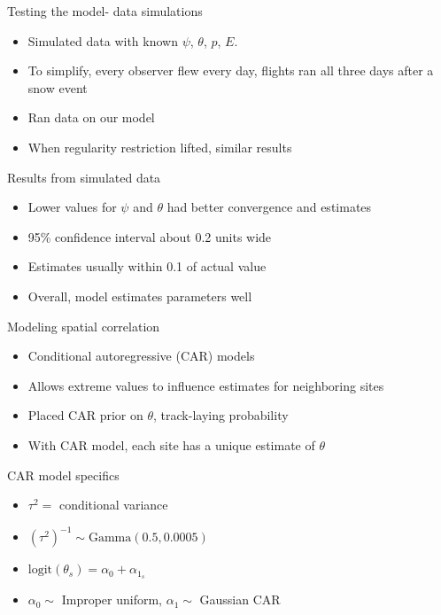 \documentclass{beamer}
\begin{document}
\begin{frame}{Testing the model- data simulations}
	\begin{itemize}
		\item Simulated data with known $\psi$, $\theta$, $p$, $E$.
		\item To simplify, every observer flew every day, flights ran all 
		three days after a snow event
		\item Ran data on our model
		\item When regularity restriction lifted, similar results
	\end{itemize}
\end{frame}

\begin{frame}{Results from simulated data}
	\begin{itemize}
		\item Lower values for $\psi$ and $\theta$ had better convergence and 
		estimates
		\item 95\% confidence interval about 0.2 units wide
		\item Estimates usually within 0.1 of actual value
		\item Overall, model estimates parameters well
	\end{itemize}
\end{frame}

\begin{frame}{Modeling spatial correlation}
	\begin{itemize}
		\item Conditional autoregressive (CAR) models
		\item Allows extreme values to influence estimates for neighboring sites
		\item Placed CAR prior on $\theta$, track-laying probability
		\item With CAR model, each site has a unique estimate of $\theta$
	\end{itemize}
\end{frame}

\begin{frame}{CAR model specifics}
	\begin{itemize}
		\item $\tau^2 =$ conditional variance
		\item $(\tau^2)^{-1} \sim \text{Gamma}(0.5,0.0005)$
		\item $\text{logit}(\theta_s)=\alpha_0+\alpha_{1_s}$
		\item $\alpha_0 \sim$ Improper uniform, $\alpha_1 \sim$ Gaussian CAR
	\end{itemize}
\end{frame}
\end{document}

